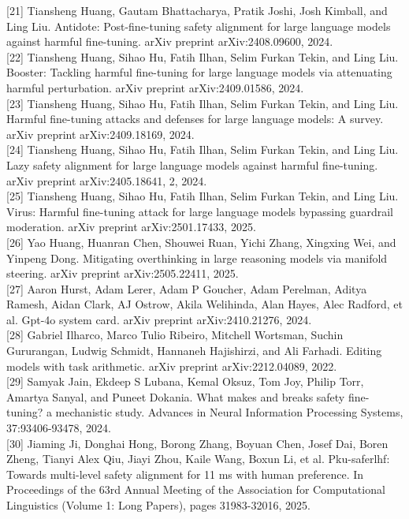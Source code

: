 \documentclass[10pt]{article}
\begin{document}
[21] Tiansheng Huang, Gautam Bhattacharya, Pratik Joshi, Josh Kimball, and Ling Liu. Antidote: Post-fine-tuning safety alignment for large language models against harmful fine-tuning. arXiv preprint arXiv:2408.09600, 2024.\\[0pt]
[22] Tiansheng Huang, Sihao Hu, Fatih Ilhan, Selim Furkan Tekin, and Ling Liu. Booster: Tackling harmful fine-tuning for large language models via attenuating harmful perturbation. arXiv preprint arXiv:2409.01586, 2024.\\[0pt]
[23] Tiansheng Huang, Sihao Hu, Fatih Ilhan, Selim Furkan Tekin, and Ling Liu. Harmful fine-tuning attacks and defenses for large language models: A survey. arXiv preprint arXiv:2409.18169, 2024.\\[0pt]
[24] Tiansheng Huang, Sihao Hu, Fatih Ilhan, Selim Furkan Tekin, and Ling Liu. Lazy safety alignment for large language models against harmful fine-tuning. arXiv preprint arXiv:2405.18641, 2, 2024.\\[0pt]
[25] Tiansheng Huang, Sihao Hu, Fatih Ilhan, Selim Furkan Tekin, and Ling Liu. Virus: Harmful fine-tuning attack for large language models bypassing guardrail moderation. arXiv preprint arXiv:2501.17433, 2025.\\[0pt]
[26] Yao Huang, Huanran Chen, Shouwei Ruan, Yichi Zhang, Xingxing Wei, and Yinpeng Dong. Mitigating overthinking in large reasoning models via manifold steering. arXiv preprint arXiv:2505.22411, 2025.\\[0pt]
[27] Aaron Hurst, Adam Lerer, Adam P Goucher, Adam Perelman, Aditya Ramesh, Aidan Clark, AJ Ostrow, Akila Welihinda, Alan Hayes, Alec Radford, et al. Gpt-4o system card. arXiv preprint arXiv:2410.21276, 2024.\\[0pt]
[28] Gabriel Ilharco, Marco Tulio Ribeiro, Mitchell Wortsman, Suchin Gururangan, Ludwig Schmidt, Hannaneh Hajishirzi, and Ali Farhadi. Editing models with task arithmetic. arXiv preprint arXiv:2212.04089, 2022.\\[0pt]
[29] Samyak Jain, Ekdeep S Lubana, Kemal Oksuz, Tom Joy, Philip Torr, Amartya Sanyal, and Puneet Dokania. What makes and breaks safety fine-tuning? a mechanistic study. Advances in Neural Information Processing Systems, 37:93406-93478, 2024.\\[0pt]
[30] Jiaming Ji, Donghai Hong, Borong Zhang, Boyuan Chen, Josef Dai, Boren Zheng, Tianyi Alex Qiu, Jiayi Zhou, Kaile Wang, Boxun Li, et al. Pku-saferlhf: Towards multi-level safety alignment for 11 ms with human preference. In Proceedings of the 63rd Annual Meeting of the Association for Computational Linguistics (Volume 1: Long Papers), pages 31983-32016, 2025.\\[0pt]
\end{document}
